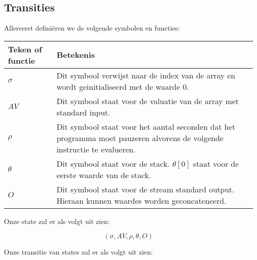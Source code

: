 \documentclass[11pt]{article}
\begin{document}
\subsection{Transities}
Allereerst defini\"eren we de volgende symbolen en functies:
\newline
\newline
\begin{tabular}{ | l | p{12cm} |}
    \hline
    Teken of functie & Betekenis \\ \hline
    \begin{math} \sigma \end{math} &  Dit symbool verwijst naar de index van de array en wordt geinitialiseerd met de waarde 0. \\ \hline
    \begin{math} AV \end{math} & Dit symbool staat voor de valuatie van de array met standard input. \\ \hline
    \begin{math} \rho \end{math} &  Dit symbool staat voor het aantal seconden dat het programma moet pauzeren alvorens de volgende instructie te evalueren. \\ \hline
    \begin{math} \theta \end{math} & Dit symbool staat voor de stack. \begin{math}\theta[0]\end{math} staat voor de eerste waarde van de stack. \\ \hline
    \begin{math} O \end{math} &  Dit symbool staat voor de stream standard output. Hieraan kunnen waardes worden geconcateneerd. \\ \hline

\end{tabular}
\newline
\newline
\newline

Onze state zal er als volgt uit zien:

\[
(\sigma, AV, \rho, \theta, O)
\]

Onze transitie van states zal er als volgt uit zien:
\end{document}
